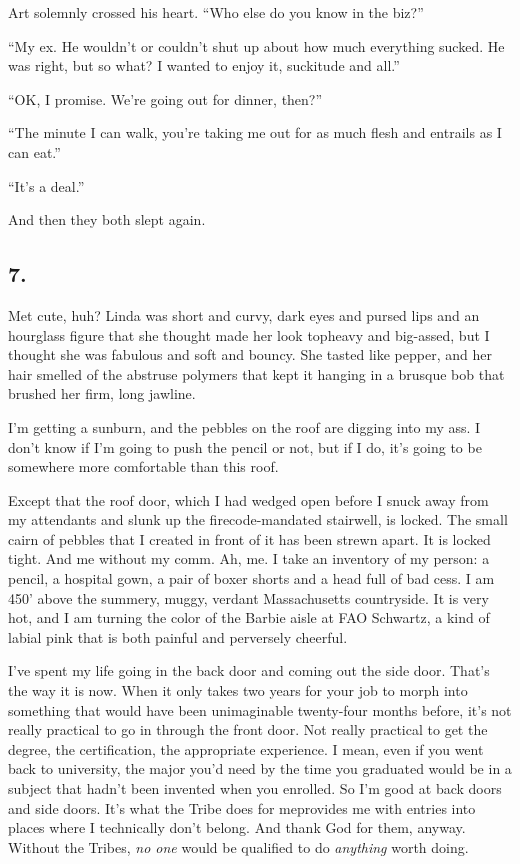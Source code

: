 Art solemnly crossed his heart. “Who else do you know in the biz?”

“My ex. He wouldn’t or couldn’t shut up about how much everything
sucked. He was right, but so what? I wanted to enjoy it, suckitude
and all.”

“OK, I promise. We’re going out for dinner, then?”

“The minute I can walk, you’re taking me out for as much flesh and
entrails as I can eat.”

“It’s a deal.”

And then they both slept again.

\subsection{7.}

Met cute, huh? Linda was short and curvy, dark eyes and pursed lips
and an hourglass figure that she thought made her look topheavy and
big-assed, but I thought she was fabulous and soft and bouncy. She
tasted like pepper, and her hair smelled of the abstruse polymers
that kept it hanging in a brusque bob that brushed her firm, long
jawline.

I’m getting a sunburn, and the pebbles on the roof are digging into
my ass. I don’t know if I’m going to push the pencil or not, but if
I do, it’s going to be somewhere more comfortable than this roof.

Except that the roof door, which I had wedged open before I snuck
away from my attendants and slunk up the firecode-mandated
stairwell, is locked. The small cairn of pebbles that I created in
front of it has been strewn apart. It is locked tight. And me
without my comm. Ah, me. I take an inventory of my person: a
pencil, a hospital gown, a pair of boxer shorts and a head full of
bad cess. I am 450’ above the summery, muggy, verdant Massachusetts
countryside. It is very hot, and I am turning the color of the
Barbie aisle at FAO Schwartz, a kind of labial pink that is both
painful and perversely cheerful.

I’ve spent my life going in the back door and coming out the side
door. That’s the way it is now. When it only takes two years for
your job to morph into something that would have been unimaginable
twenty-four months before, it’s not really practical to go in
through the front door. Not really practical to get the degree, the
certification, the appropriate experience. I mean, even if you went
back to university, the major you’d need by the time you graduated
would be in a subject that hadn’t been invented when you enrolled.
So I’m good at back doors and side doors. It’s what the Tribe does
for me{\dash}provides me with entries into places where I technically
don’t belong. And thank God for them, anyway. Without the Tribes,
\emph{no one} would be qualified to do \emph{anything} worth
doing.

